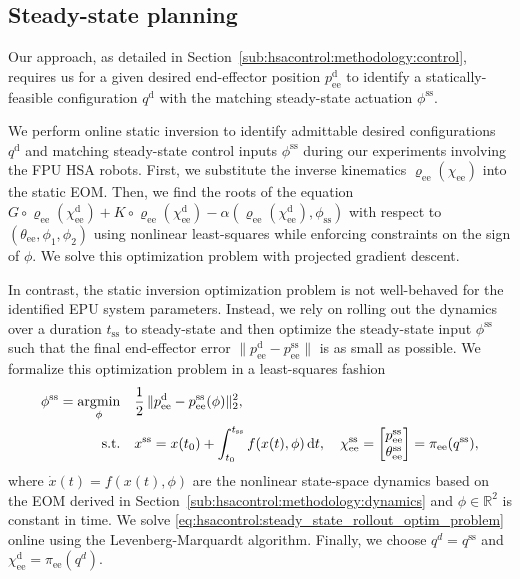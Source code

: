 \subsection{Steady-state planning}\label{sub:hsacontrol:experiments:steady_state_planning}
Our approach, as detailed in Section~\ref{sub:hsacontrol:methodology:control}, requires us for a given desired end-effector position $p_\mathrm{ee}^\mathrm{d}$ to identify a statically-feasible configuration $q^\mathrm{d}$ with the matching steady-state actuation $\phi^\mathrm{ss}$.

We perform online static inversion to identify admittable desired configurations $q^\mathrm{d}$ and matching steady-state control inputs $\phi^\mathrm{ss}$ during our experiments involving the FPU \gls{HSA} robots. First, we substitute the inverse kinematics $\varrho_\mathrm{ee}(\chi_\mathrm{ee})$ into the static \gls{EOM}. Then, we find the roots of the equation $G\circ\varrho_\mathrm{ee}(\chi_\mathrm{ee}^\mathrm{d}) + K\circ\varrho_\mathrm{ee}(\chi_\mathrm{ee}^\mathrm{d})-\alpha(\varrho_\mathrm{ee}(\chi_\mathrm{ee}^\mathrm{d}), \phi_\mathrm{ss})$ with respect to $(\theta_\mathrm{ee},\phi_1, \phi_2)$ using nonlinear least-squares while enforcing constraints on the sign of $\phi$. We solve this optimization problem with projected gradient descent.

In contrast, the static inversion optimization problem is not well-behaved for the identified EPU system parameters. Instead, we rely on rolling out the dynamics over a duration $t_\mathrm{ss}$ to steady-state and then optimize the steady-state input $\phi^\mathrm{ss}$ such that the final end-effector error $\lVert p_\mathrm{ee}^\mathrm{d} - p_\mathrm{ee}^\mathrm{ss} \rVert$ is as small as possible. We formalize this optimization problem in a least-squares fashion
\begin{equation}\label{eq:hsacontrol:steady_state_rollout_optim_problem}
\begin{aligned}
    \phi^\mathrm{ss} = \operatorname*{\arg\!\min}_\mathrm{\phi} \quad & \frac{1}{2} \, \lVert p_\mathrm{ee}^\mathrm{d} - p_\mathrm{ee}^\mathrm{ss}(\phi) \rVert_2^2,\\
    \textrm{s.t.} \quad & x^\mathrm{ss} = x(t_0) + \int_{t_0}^{t_\mathrm{ss}} f(x(t), \phi) \, \mathrm{d}t, \quad \chi_\mathrm{ee}^\mathrm{ss} = \begin{bmatrix}
        p_\mathrm{ee}^\mathrm{ss}\\
        \theta_\mathrm{ee}^\mathrm{ss}
    \end{bmatrix} = \pi_\mathrm{ee}(q^\mathrm{ss}),\\
\end{aligned}
\end{equation}
where $\dot{x}(t) = f(x(t), \phi)$ are the nonlinear state-space dynamics based on the \gls{EOM} derived in Section~\ref{sub:hsacontrol:methodology:dynamics} and $\phi \in \mathbb{R}^2$ is constant in time. We solve \eqref{eq:hsacontrol:steady_state_rollout_optim_problem} online using the Levenberg-Marquardt algorithm. Finally, we choose $q^d = q^\mathrm{ss}$ and $\chi_\mathrm{ee}^\mathrm{d} = \pi_\mathrm{ee}(q^d)$.

